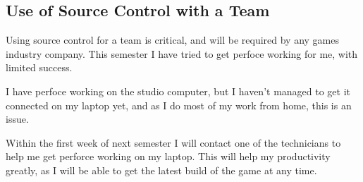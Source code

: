 \documentclass{scrartcl}
\begin{document}
\par




\subsection{Use of Source Control with a Team}

Using source control for a team is critical, and will be required by any games industry company.
This semester I have tried to get perfoce working for me, with limited success.

I have perfoce working on the studio computer, but I haven't managed to get it connected on my laptop yet, and as I do most of my work from home, this is an issue.


Within the first week of next semester I will contact one of the technicians to help me get perforce working on my laptop. This will help my productivity greatly, as I will be able to get the latest build of the game at any time.

\par






%
\end{document}
